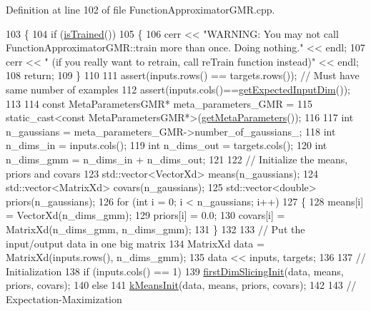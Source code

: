 Definition at line 102 of file Function\+Approximator\+G\+M\+R.\+cpp.


\begin{DoxyCode}
103 \{
104   \textcolor{keywordflow}{if} (\hyperlink{classDmpBbo_1_1FunctionApproximator_a178135f623d9b9058870851a53299c6e}{isTrained}())  
105   \{
106     cerr << \textcolor{stringliteral}{"WARNING: You may not call FunctionApproximatorGMR::train more than once. Doing nothing."} << 
      endl;
107     cerr << \textcolor{stringliteral}{"   (if you really want to retrain, call reTrain function instead)"} << endl;
108     \textcolor{keywordflow}{return};
109   \}
110   
111   assert(inputs.rows() == targets.rows()); \textcolor{comment}{// Must have same number of examples}
112   assert(inputs.cols()==\hyperlink{classDmpBbo_1_1FunctionApproximator_af5a550bcf65d5a29a153a594cc4e3fa1}{getExpectedInputDim}());
113 
114   \textcolor{keyword}{const} MetaParametersGMR* meta\_parameters\_GMR = 
115     \textcolor{keyword}{static\_cast<}\textcolor{keyword}{const }MetaParametersGMR*\textcolor{keyword}{>}(\hyperlink{classDmpBbo_1_1FunctionApproximator_a6f1a44062eac61d88b647c358bcda155}{getMetaParameters}());
116 
117   \textcolor{keywordtype}{int} n\_gaussians = meta\_parameters\_GMR->number\_of\_gaussians\_;
118   \textcolor{keywordtype}{int} n\_dims\_in = inputs.cols();
119   \textcolor{keywordtype}{int} n\_dims\_out = targets.cols();
120   \textcolor{keywordtype}{int} n\_dims\_gmm = n\_dims\_in + n\_dims\_out;
121   
122   \textcolor{comment}{// Initialize the means, priors and covars}
123   std::vector<VectorXd> means(n\_gaussians);
124   std::vector<MatrixXd> covars(n\_gaussians);
125   std::vector<double> priors(n\_gaussians);
126   \textcolor{keywordflow}{for} (\textcolor{keywordtype}{int} i = 0; i < n\_gaussians; i++)
127   \{
128     means[i] = VectorXd(n\_dims\_gmm);
129     priors[i] = 0.0;
130     covars[i] = MatrixXd(n\_dims\_gmm, n\_dims\_gmm);
131   \}
132   
133   \textcolor{comment}{// Put the input/output data in one big matrix}
134   MatrixXd data = MatrixXd(inputs.rows(), n\_dims\_gmm);
135   data << inputs, targets;
136 
137   \textcolor{comment}{// Initialization}
138   \textcolor{keywordflow}{if} (inputs.cols() == 1)
139     \hyperlink{classDmpBbo_1_1FunctionApproximatorGMR_ab99de8c0d7c1870958e63f1bfc198303}{firstDimSlicingInit}(data, means, priors, covars);
140   \textcolor{keywordflow}{else}
141     \hyperlink{classDmpBbo_1_1FunctionApproximatorGMR_af9a5e39e32c14b1daa7aa5ecfe1a5bfb}{kMeansInit}(data, means, priors, covars);
142   
143   \textcolor{comment}{// Expectation-Maximization}

\end{DoxyCode}
